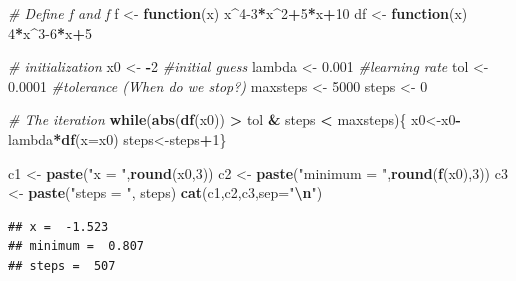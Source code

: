 \documentclass[
]{book}
\newenvironment{Shaded}{\begin{snugshade}}{\end{snugshade}}
\newcommand{\AttributeTok}[1]{\textcolor[rgb]{0.13,0.29,0.53}{#1}}
\newcommand{\CommentTok}[1]{\textcolor[rgb]{0.56,0.35,0.01}{\textit{#1}}}
\newcommand{\ControlFlowTok}[1]{\textcolor[rgb]{0.13,0.29,0.53}{\textbf{#1}}}
\newcommand{\DecValTok}[1]{\textcolor[rgb]{0.00,0.00,0.81}{#1}}
\newcommand{\FloatTok}[1]{\textcolor[rgb]{0.00,0.00,0.81}{#1}}
\newcommand{\FunctionTok}[1]{\textcolor[rgb]{0.13,0.29,0.53}{\textbf{#1}}}
\newcommand{\NormalTok}[1]{#1}
\newcommand{\OtherTok}[1]{\textcolor[rgb]{0.56,0.35,0.01}{#1}}
\newcommand{\SpecialCharTok}[1]{\textcolor[rgb]{0.81,0.36,0.00}{\textbf{#1}}}
\newcommand{\StringTok}[1]{\textcolor[rgb]{0.31,0.60,0.02}{#1}}
\theoremstyle{definition}
\theoremstyle{definition}
\theoremstyle{definition}
\theoremstyle{definition}
\theoremstyle{remark}
\begin{document}
\begin{Shaded}
\begin{Highlighting}[]
\CommentTok{\# Define f and f\textquotesingle{}}
\NormalTok{f }\OtherTok{\textless{}{-}} \ControlFlowTok{function}\NormalTok{(x) x}\SpecialCharTok{\^{}}\DecValTok{4{-}3}\SpecialCharTok{*}\NormalTok{x}\SpecialCharTok{\^{}}\DecValTok{2}\SpecialCharTok{+}\DecValTok{5}\SpecialCharTok{*}\NormalTok{x}\SpecialCharTok{+}\DecValTok{10}
\NormalTok{df }\OtherTok{\textless{}{-}} \ControlFlowTok{function}\NormalTok{(x) }\DecValTok{4}\SpecialCharTok{*}\NormalTok{x}\SpecialCharTok{\^{}}\DecValTok{3{-}6}\SpecialCharTok{*}\NormalTok{x}\SpecialCharTok{+}\DecValTok{5}

\CommentTok{\# initialization}
\NormalTok{x0 }\OtherTok{\textless{}{-}} \SpecialCharTok{{-}}\DecValTok{2} \CommentTok{\#initial guess}
\NormalTok{lambda }\OtherTok{\textless{}{-}} \FloatTok{0.001} \CommentTok{\#learning rate}
\NormalTok{tol }\OtherTok{\textless{}{-}} \FloatTok{0.0001} \CommentTok{\#tolerance (When do we stop?)}
\NormalTok{maxsteps }\OtherTok{\textless{}{-}} \DecValTok{5000}
\NormalTok{steps }\OtherTok{\textless{}{-}} \DecValTok{0}

\CommentTok{\# The iteration}
\ControlFlowTok{while}\NormalTok{(}\FunctionTok{abs}\NormalTok{(}\FunctionTok{df}\NormalTok{(x0)) }\SpecialCharTok{\textgreater{}}\NormalTok{ tol }\SpecialCharTok{\&}\NormalTok{ steps }\SpecialCharTok{\textless{}}\NormalTok{ maxsteps)\{}
\NormalTok{  x0}\OtherTok{\textless{}{-}}\NormalTok{x0}\SpecialCharTok{{-}}\NormalTok{lambda}\SpecialCharTok{*}\FunctionTok{df}\NormalTok{(}\AttributeTok{x=}\NormalTok{x0)}
\NormalTok{  steps}\OtherTok{\textless{}{-}}\NormalTok{steps}\SpecialCharTok{+}\DecValTok{1}\NormalTok{\}}

\NormalTok{c1 }\OtherTok{\textless{}{-}} \FunctionTok{paste}\NormalTok{(}\StringTok{"x = "}\NormalTok{,}\FunctionTok{round}\NormalTok{(x0,}\DecValTok{3}\NormalTok{))}
\NormalTok{c2 }\OtherTok{\textless{}{-}} \FunctionTok{paste}\NormalTok{(}\StringTok{"minimum = "}\NormalTok{,}\FunctionTok{round}\NormalTok{(}\FunctionTok{f}\NormalTok{(x0),}\DecValTok{3}\NormalTok{))}
\NormalTok{c3 }\OtherTok{\textless{}{-}} \FunctionTok{paste}\NormalTok{(}\StringTok{"steps = "}\NormalTok{, steps)}
\FunctionTok{cat}\NormalTok{(c1,c2,c3,}\AttributeTok{sep=}\StringTok{"}\SpecialCharTok{\textbackslash{}n}\StringTok{"}\NormalTok{)}
\end{Highlighting}
\end{Shaded}

\begin{verbatim}
## x =  -1.523
## minimum =  0.807
## steps =  507
\end{verbatim}
\end{document}
